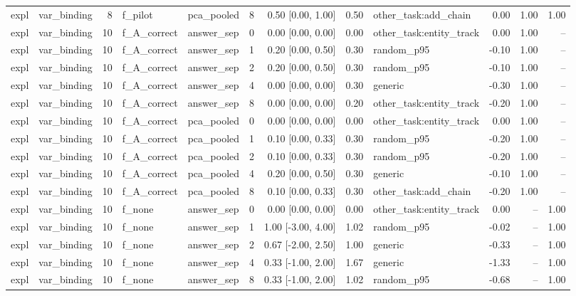 \begin{tabular}{llrllrrrlrrr}
expl & var\_binding & 8 & f\_pilot & pca\_pooled & 8 & 0.50 [0.00, 1.00] & 0.50 & other\_task:add\_chain & 0.00 & 1.00 & 1.00 \\
expl & var\_binding & 10 & f\_A\_correct & answer\_sep & 0 & 0.00 [0.00, 0.00] & 0.00 & other\_task:entity\_track & 0.00 & 1.00 & -- \\
expl & var\_binding & 10 & f\_A\_correct & answer\_sep & 1 & 0.20 [0.00, 0.50] & 0.30 & random\_p95 & -0.10 & 1.00 & -- \\
expl & var\_binding & 10 & f\_A\_correct & answer\_sep & 2 & 0.20 [0.00, 0.50] & 0.30 & random\_p95 & -0.10 & 1.00 & -- \\
expl & var\_binding & 10 & f\_A\_correct & answer\_sep & 4 & 0.00 [0.00, 0.00] & 0.30 & generic & -0.30 & 1.00 & -- \\
expl & var\_binding & 10 & f\_A\_correct & answer\_sep & 8 & 0.00 [0.00, 0.00] & 0.20 & other\_task:entity\_track & -0.20 & 1.00 & -- \\
expl & var\_binding & 10 & f\_A\_correct & pca\_pooled & 0 & 0.00 [0.00, 0.00] & 0.00 & other\_task:entity\_track & 0.00 & 1.00 & -- \\
expl & var\_binding & 10 & f\_A\_correct & pca\_pooled & 1 & 0.10 [0.00, 0.33] & 0.30 & random\_p95 & -0.20 & 1.00 & -- \\
expl & var\_binding & 10 & f\_A\_correct & pca\_pooled & 2 & 0.10 [0.00, 0.33] & 0.30 & random\_p95 & -0.20 & 1.00 & -- \\
expl & var\_binding & 10 & f\_A\_correct & pca\_pooled & 4 & 0.20 [0.00, 0.50] & 0.30 & generic & -0.10 & 1.00 & -- \\
expl & var\_binding & 10 & f\_A\_correct & pca\_pooled & 8 & 0.10 [0.00, 0.33] & 0.30 & other\_task:add\_chain & -0.20 & 1.00 & -- \\
expl & var\_binding & 10 & f\_none & answer\_sep & 0 & 0.00 [0.00, 0.00] & 0.00 & other\_task:entity\_track & 0.00 & -- & 1.00 \\
expl & var\_binding & 10 & f\_none & answer\_sep & 1 & 1.00 [-3.00, 4.00] & 1.02 & random\_p95 & -0.02 & -- & 1.00 \\
expl & var\_binding & 10 & f\_none & answer\_sep & 2 & 0.67 [-2.00, 2.50] & 1.00 & generic & -0.33 & -- & 1.00 \\
expl & var\_binding & 10 & f\_none & answer\_sep & 4 & 0.33 [-1.00, 2.00] & 1.67 & generic & -1.33 & -- & 1.00 \\
expl & var\_binding & 10 & f\_none & answer\_sep & 8 & 0.33 [-1.00, 2.00] & 1.02 & random\_p95 & -0.68 & -- & 1.00 \\

\end{tabular}
